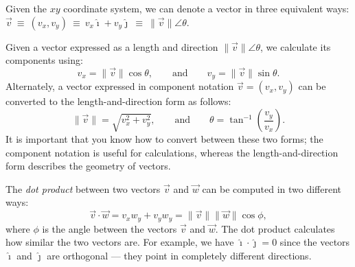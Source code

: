 \documentclass[letterpaper,9pt,journal]{IEEEtran}
\begin{document}
Given the $xy$ coordinate system, we can denote a vector in three equivalent ways:
$
  \vec{v}  
  \ \equiv \ (v_x,v_y)
  \ \equiv \  v_x\hat{\imath} + v_y\hat{\jmath} 
  \ \equiv \ 
  \|\vec{v}\| \angle \theta
$.

Given a vector expressed as a length and direction $\|\vec{v}\| \angle \theta$,
we calculate its components using:
\[
  v_x = \|\vec{v}\| \cos\theta, \qquad \text{and} \qquad   v_y = \|\vec{v}\|\sin\theta.
\]
Alternately, a vector expressed in component notation $\vec{v}=(v_x,v_y)$ 
can be converted to the length-and-direction form as follows:
\[
 \|\vec{v}\|  = \sqrt{ v_x^2 + v_y^2 }, \qquad \text{and} \qquad \theta = \tan^{-1}\!\left( \frac{ v_{y} }{ v_{x} } \right).
\]
It is important that you know how to convert between these two forms;
the component notation is useful for calculations, 
whereas the length-and-direction form describes the geometry of vectors.


The \emph{dot product} between two vectors $\vec{v}$ and $\vec{w}$ 
can be  computed in two different ways:
\[
 \vec{v}\cdot\vec{w} = v_xw_y + v_yw_y = \|\vec{v}\| \|\vec{w}\| \cos\phi,
\]
where $\phi$ is the angle between the vectors $\vec{v}$ and $\vec{w}$.
The dot product calculates how similar the two vectors are.
For example, we have $\hat{\imath} \cdot \hat{\jmath} =0$
since the vectors $\hat{\imath}$ and $\hat{\jmath}$ are orthogonal --- they point in completely different directions.
%






%
\end{document}
